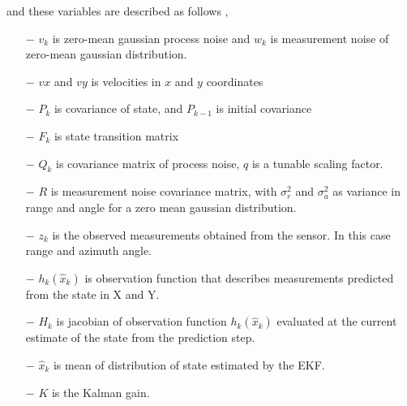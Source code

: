 \documentclass[12pt]{article}
\begin{document}
and these variables are described as follows ,
\begin{itemize}
    \item[$-$] $v_{k}$ is zero-mean gaussian process noise and $w_{k}$ is measurement noise of zero-mean gaussian distribution. 
    \item[$-$] $vx$ and $vy$ is velocities in $x$ and $y$ coordinates
    \item[$-$] $P_{k}$ is covariance of state, and $P_{k-1}$ is initial covariance
    \item[$-$] $F_{k}$ is state transition matrix
    \item[$-$] $Q_{k}$ is covariance matrix of process noise, $q$ is a tunable scaling factor.
	\item[$-$] $R$ is measurement noise covariance matrix, with $\sigma_{r}^{2}$ and $\sigma_{a}^{2}$ as variance in range and angle for a zero mean gaussian distribution.
    \item[$-$] $z_{k}$ is the observed measurements obtained from the sensor. In this case range and azimuth angle.
 
    \item[$-$] $h_{k}(\hat{x}_{k})$ is observation function that describes  measurements  predicted from the state in X and Y.
    \item[$-$] $H_{k}$ is jacobian of observation function $h_{k}(\hat{x}_{k})$ evaluated at the current estimate of the state from the prediction step.
    \item[$-$] $\hat{x}_{k}$ is mean  of distribution of state estimated by the EKF.
    \item[$-$] $K$ is the Kalman gain.

\end{itemize}
\end{document}
